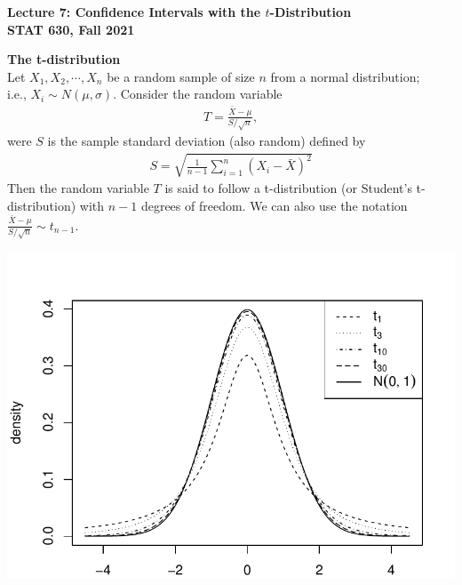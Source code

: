 \documentclass[fleqn, 12pt]{article}\usepackage[]{graphicx}\usepackage[]{color}
\makeatletter
\def\maxwidth{ %
  \ifdim\Gin@nat@width>\linewidth
    \linewidth
  \else
    \Gin@nat@width
  \fi
}
\newenvironment{knitrout}{}{} %
\makeatother
\begin{document}
\setlength\parindent{0pt}

\begin{center}
\textbf{Lecture 7: Confidence Intervals with the $t$-Distribution}\\
\textbf{STAT 630, Fall 2021}\\
\hrulefill
\end{center}

\textbf{The t-distribution}\\

Let $X_1, X_2, \cdots, X_n$ be a random sample of size $n$ from a normal distribution;\\ i.e., $X_i \sim N(\mu, \sigma)$.  Consider the random variable 
\begin{align*}
T=\frac{\bar{X} - \mu}{S / \sqrt{n}},
\end{align*}
were $S$ is the sample standard deviation (also random) defined by
\begin{align*}
S = \sqrt{\frac{1}{n-1} \sum_{i=1}^n (X_i - \bar{X})^2}
\end{align*}
Then the random variable $T$ is said to follow a t-distribution (or Student's t-distribution) with $n-1$ degrees of freedom.  We can also use the notation $\frac{\bar{X} - \mu}{S / \sqrt{n}} \sim t_{n-1}$.

\begin{knitrout}
\color{fgcolor}
\includegraphics[width=\maxwidth]{figure/unnamed-chunk-1-1} 
\end{knitrout}
\clearpage
\end{document}
